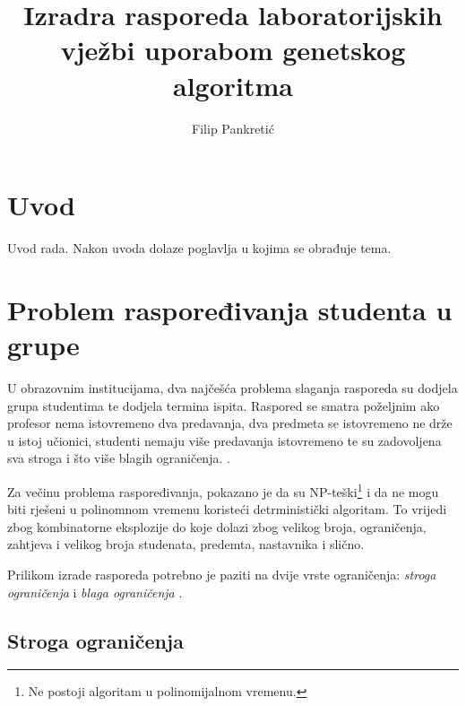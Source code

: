 \documentclass[times, utf8, zavrsni]{fer}
\begin{document}

\title{Izradra rasporeda laboratorijskih vježbi uporabom genetskog algoritma}

\author{Filip Pankretić}

\maketitle

\izvornik


\tableofcontents
\listoffigures

\chapter{Uvod}
Uvod rada. Nakon uvoda dolaze poglavlja u kojima se obrađuje tema.

\chapter{Problem raspoređivanja studenta u grupe}

U obrazovnim institucijama, dva najčešća problema slaganja rasporeda su dodjela grupa studentima te dodjela termina ispita. Raspored se smatra poželjnim ako profesor nema istovremeno dva predavanja, dva predmeta se istovremeno ne drže u istoj učionici, studenti nemaju više predavanja istovremeno te su zadovoljena sva stroga i što više blagih ograničenja. \citep{ganguli2017study}.

Za večinu problema raspoređivanja, pokazano je da su NP-teški\footnote{Ne postoji algoritam u polinomijalnom vremenu.} i da ne mogu biti rješeni u polinomnom vremenu koristeći detrministički algoritam. To vrijedi zbog kombinatorne eksplozije do koje dolazi zbog velikog broja, ograničenja, zahtjeva i velikog broja studenata, predemta, nastavnika i slično.

Prilikom izrade rasporeda potrebno je paziti na dvije vrste ograničenja: \emph{stroga ograničenja}  i \emph{blaga ograničenja} .

\section{Stroga ograničenja}
\end{document}
